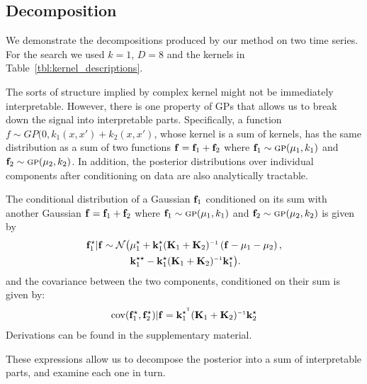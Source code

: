 \documentclass[twoside]{article}
\begin{document}
\subsection{Decomposition}

We demonstrate the decompositions produced by our method on two time series.
For the search we used $k = 1$, $D = 8$ and the kernels in Table~\ref{tbl:kernel_descriptions}.



The sorts of structure implied by complex kernel might not be immediately interpretable.
However, there is one property of GPs that allows us to break down the signal into interpretable parts.
Specifically, a function $f \sim GP(0, k_1(x, x') + k_2(x,x')$, whose kernel is a sum of kernels, has the same distribution as a sum of two functions ${\bf{f}} = {\bf{f}}_1 + {\bf{f}}_2$ where ${\bf{f}}_1 \sim {\textsc{gp}}( {\bf{\mu}}_1, k_1)$ and ${\bf{f}}_2 \sim {\textsc{gp}}( {\bf{\mu}}_2, k_2)$.
In addition, the posterior distributions over individual components after conditioning on data are also analytically tractable.

The conditional distribution of a Gaussian ${\bf{f}}_1$ conditioned on its sum with another Gaussian ${\bf{f}} = {\bf{f}}_1 + {\bf{f}}_2$ where ${\bf{f}}_1 \sim {\textsc{gp}}( {\bf{\mu}}_1, k_1)$ and ${\bf{f}}_2 \sim {\textsc{gp}}( {\bf{\mu}}_2, k_2)$ is given by
\begin{align}
\vf_1^\star | \vf \sim \mathcal{N} \big( & \vmu_1^\star + \vk_1^\star (\vK_1 + \vK_2)\inv \left( \vf - \vmu_1 - \vmu_2 \right), \nonumber \\
& \vk_1^{\star\star} - \vk_1^\star (\vK_1 + \vK_2)\inv \vk_1^\star \big).
\end{align}
and the covariance between the two components, conditioned on their sum is given by:
\begin{align}
\cov(\vf_1^\star, \vf_2^\star) | \vf = \vk_1^{\star\tra} (\vK_1 + \vK_2)\inv \vk_2^\star
\end{align}
Derivations can be found in the supplementary material.

These expressions allow us to decompose the posterior into a sum of interpretable parts, and examine each one in turn.
\end{document}
